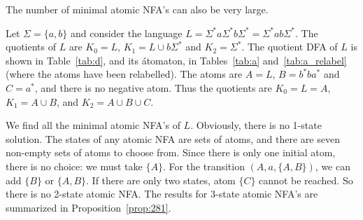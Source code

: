 \documentclass{llncs}
\newcommand{\Sig}{\Sigma}
\begin{document}
The number of minimal atomic NFA's can also be very large. 
\begin{example}
\label{ex:atomicminimal}
Let $\Sig=\{a,b\}$ and consider the language $L=\Sig^*a\Sig^*b\Sig^*=\Sig^*ab\Sig^*$.
The quotients of $L$ are $K_0=L$, $K_1=L\cup b\Sig^*$ and $K_2=\Sig^*$.
The quotient DFA of $L$ is shown in Table~\ref{tab:d}, and its \'atomaton, in Tables~\ref{tab:a} and~\ref{tab:a_relabel} (where the atoms have been relabelled). 
The atoms  are $A=L$, $B=b^*ba^*$ and $C=a^*$, and there is no negative atom.
Thus the quotients are $K_0=L=A$, $K_1=A\cup B$, and $K_2=A\cup B\cup C$.

We find all the minimal atomic NFA's of $L$.
Obviously, there is no 1-state solution.
The states of any atomic NFA are sets of atoms, and 
there are seven non-empty sets of atoms to choose from. 
Since there is only one initial atom, there is no choice: we must take $\{A\}$.
For the transition $(A,a,\{A,B\})$, we can add $\{B\}$ or $\{A,B\}$. 
If there are only two states, atom $\{C\}$ cannot be reached. So there is no  2-state atomic NFA.
The results for 3-state atomic NFA's  are summarized in Proposition~\ref{prop:281}. 



\end{example}
\end{document}
